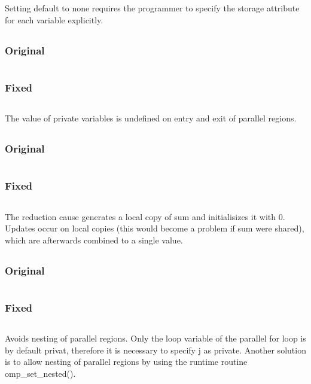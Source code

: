 \documentclass[parskip]{scrartcl}
\begin{document}
	Setting default to none requires the programmer to specify the storage attribute for each variable explicitly.
	\subsection{}
	\subsubsection{Original}
	\inputminted{c}{ex2/04.c}
	
	\subsubsection{Fixed}
	\inputminted{c}{ex2/04_fixed.c}
	
	The value of private variables is undefined on entry and exit of parallel regions.
	
	\subsection{}
	\subsubsection{Original}
	\inputminted{c}{ex2/05.c}
	
	\subsubsection{Fixed}
	\inputminted{c}{ex2/05_fixed.c}
	
	The reduction cause generates a local copy of sum and initialisizes it with 0. Updates occur on local copies (this would become a problem if sum were shared), which are afterwards combined to a single value.
	
	\subsection{}
	\subsubsection{Original}
	\inputminted{c}{ex2/06.c}
	
	\subsubsection{Fixed}
	\inputminted{c}{ex2/06_fixed.c}
	
	Avoids nesting of parallel regions. Only the loop variable of the parallel for loop is by default privat, therefore it is necessary to specify j as private. Another solution is to allow nesting of parallel regions by using the runtime routine omp\_set\_nested().
\end{document}
